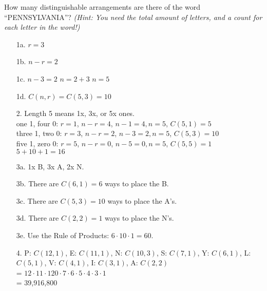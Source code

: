 {    
    \begin{questionNOGRADE}{\thequestion}
	    How many distinguishable arrangements are there of the word \\ ``PENNSYLVANIA''?
	    \textit{(Hint: You need the total amount of letters, and a count for each letter in the word!)}
	\end{questionNOGRADE}
	
}{
    \begin{itemize}
        \item[1a.]	$r = 3$
        \item[1b.]	$n-r = 2$
        \item[1c.]	$n-3 = 2$ \tab $n = 2 + 3$ \tab $n = 5$
        \item[1d.]	$C(n,r) = C(5,3) = 10$
        
        \item[2.]	Length 5 means 1x, 3x, or 5x ones.
					\\ one 1, four 0:	$r = 1$, $n-r = 4$, $n-1=4, n=5$, $C(5,1) = 5$
					\\ three 1, two 0:	$r = 3$, $n-r = 2$, $n-3=2, n=5$, $C(5,3) = 10$
					\\ five 1, zero 0:	$r = 5$, $n-r = 0$, $n-5=0, n=5$, $C(5,5) = 1$
					\\ $5 + 10 + 1 = 16$
		
		\item[3a.]	1x B, 3x A, 2x N.
		\item[3b.]	There are $C(6,1) = 6$ ways to place the B.
		\item[3c.]	There are $C(5,3) = 10$ ways to place the A's.
		\item[3d.]	There are $C(2,2) = 1$ ways to place the N's.
		\item[3e.]	Use the Rule of Products: $6 \cdot 10 \cdot 1 = 60$.
		
		\item[4.]	P: $C(12,1)$, E: $C(11,1)$, N: $C(10,3)$, S: $C(7,1)$, Y: $C(6,1)$, L: $C(5,1)$, V: $C(4,1)$, I: $C(3,1)$, A: $C(2,2)$ \\
					= $12 \cdot 11 \cdot 120 \cdot 7 \cdot 6 \cdot 5 \cdot 4 \cdot 3 \cdot 1$ \\
					= 39,916,800
    \end{itemize}
}


